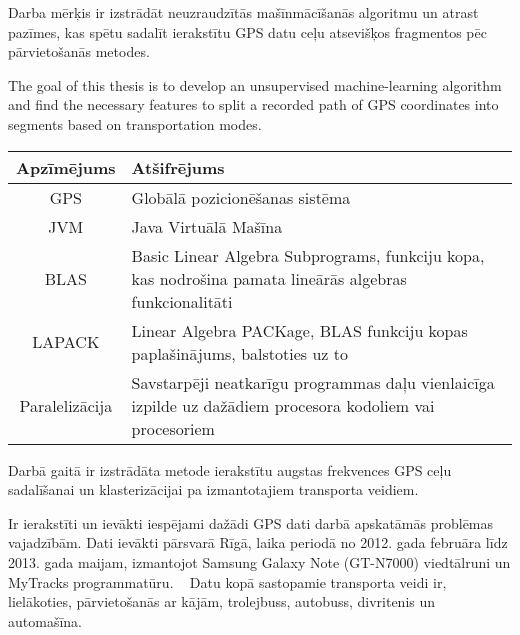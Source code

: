 \documentclass{ludis}
\begin{document}
\maketitle

\begin{abstract-lv}
  Darba mērķis ir izstrādāt neuzraudzītās mašīnmācīšanās algoritmu un atrast pazīmes, kas spētu
  sadalīt ierakstītu GPS datu ceļu atsevišķos fragmentos pēc pārvietošanās metodes.
\end{abstract-lv}

\begin{abstract-en}
  The goal of this thesis is to develop an unsupervised machine-learning algo\-rithm and find the 
  necessary features to split a recorded path of GPS coordi\-nates into segments based on
  transportation modes.
\end{abstract-en}

\tableofcontents

\setlength\LTleft{0pt}
\setlength\LTright{0pt}
\begin{longtable}{| c | p{28em} |}
  \hline
  \textbf{Apzīmējums} & \textbf{Atšifrējums}\\ 
  \endhead
  \hline
  GPS & Globālā pozicionēšanas sistēma\\
  JVM & Java Virtuālā Mašīna\\
  BLAS & Basic Linear Algebra Subprograms, funkciju kopa, kas nodrošina pamata lineārās algebras 
  funkcionalitāti\\
  LAPACK & Linear Algebra PACKage, BLAS funkciju kopas paplašinājums, balstoties uz to\\
  Paralelizācija & Savstarpēji neatkarīgu programmas daļu vienlaicīga izpilde uz dažādiem procesora
  kodoliem vai procesoriem\\
  \hline
\end{longtable}

Darbā gaitā ir izstrādāta metode ierakstītu augstas frekvences GPS ceļu sadalīšanai un 
klasterizācijai pa izmantotajiem transporta veidiem. 

Ir ierakstīti un ievākti iespējami dažādi GPS dati darbā apskatāmās prob\-lēmas vajadzībām. Dati
ievākti pārsvarā Rīgā, laika periodā no 2012. gada februāra līdz 2013. gada maijam, izmantojot Samsung
Galaxy Note (GT-N7000) viedtālruni un MyTracks programmatūru. ~\cite{mytracks} Datu kopā sastopamie
transporta veidi ir, lielākoties, pārvietošanās ar kājām, trolejbuss, autobuss, divritenis un 
automašīna.
\end{document}
